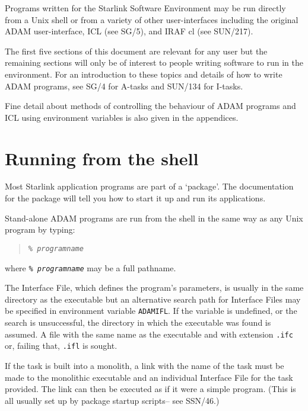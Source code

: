 \documentclass[twoside,11pt]{article}
\newcommand{\htmladdnormallink}[2]{#1}
\newcommand{\latex}[1]{#1}
\newcommand{\xref}[3]{#1}
\newcommand{\xlabel}[1]{}
\renewcommand{\_}{\texttt{\symbol{95}}}
\newcommand{\IRAFURL}{http://www.starlink.ac.uk/iraf/web/iraf-homepage.html}
\begin{document}
Programs written for the Starlink Software Environment may be run directly 
from a Unix shell or from a variety of other user-interfaces including 
the original ADAM user-interface, 
\xref{ICL}{sg5}{abstract}\latex{ (see SG/5)},
and
\htmladdnormallink{IRAF}{\IRAFURL} 
cl (see
\xref{SUN/217}{sun217}{}).

The first five sections of this document are relevant for any user but the
remaining sections will only be of interest to people writing software to run
in the environment.
For an introduction to these topics and details of how to write ADAM 
programs, see 
\xref{SG/4}{sg4}{} 
for A-tasks and 
\xref{SUN/134}{sun134}{}
for I-tasks.

Fine detail about methods of controlling the behaviour of ADAM
programs and ICL using environment variables is also
given in the appendices.

\section{\xlabel{running_from_the_shell}\label{running_from_the_shell}Running from the shell}
Most Starlink application programs are part of a `package'. The documentation
for the package will tell you how to start it up and run its applications.

Stand-alone ADAM programs are run from the shell in the same way as any Unix
program by typing:
\small
\begin{quote} 
\texttt{\% \textit{program\_name}}
\end{quote}
\normalsize
where \texttt{\% \textit{program\_name}} may be a full pathname.

The Interface File, which defines the program's parameters, is usually in the 
same directory as the executable but an alternative search path for Interface 
Files may be specified in environment variable \texttt{ADAM\_IFL}.
If the variable is undefined, or the search is unsuccessful, the directory in
which the executable was found is assumed.
A file with the same name as the executable and with extension 
\texttt{.ifc} or, failing that, \texttt{.ifl} is sought.

If the task is built into a monolith, a link with the name of the task must be
made to the monolithic executable and an individual Interface File for the task
provided. The link can then be executed as if it were a simple program.
(This is all usually set up by 
\xref{package startup
scripts}{ssn64}{shell_package_startup_scripts}\latex{-- see SSN/46}.)
\end{document}
